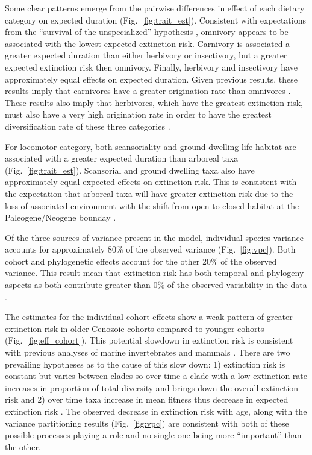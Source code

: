 \documentclass[12pt]{article}
\begin{document}
Some clear patterns emerge from the pairwise differences in effect of each dietary category on expected duration (Fig.~\ref{fig:trait_est}). Consistent with expectations from the ``survival of the unspecialized'' hypothesis \cite{Liow2004a,Simpson1944}, omnivory appears to be associated with the lowest expected extinction risk. Carnivory is associated a greater expected duration than either herbivory or insectivory, but a greater expected extinction risk then omnivory. Finally, herbivory and insectivory have approximately equal effects on expected duration. Given previous results, these results imply that carnivores have a greater origination rate than omnivores \cite{Price2012}. These results also imply that herbivores, which have the greatest extinction risk, must also have a very high origination rate in order to have the greatest diversification rate of these three categories \cite{Price2012}. 

For locomotor category, both scansoriality and ground dwelling life habitat are associated with a greater expected duration than arboreal taxa (Fig.~\ref{fig:trait_est}). Scansorial and ground dwelling taxa also have approximately equal expected effects on extinction risk.  This is consistent with the expectation that arboreal taxa will have greater extinction risk due to the loss of associated environment with the shift from open to closed habitat at the Paleogene/Neogene bounday \cite{Blois2009}.

Of the three sources of variance present in the model, individual species variance accounts for approximately 80\% of the observed variance (Fig.~\ref{fig:vpc}). Both cohort and phylogenetic effects account for the other 20\% of the observed variance. This result mean that extinction risk has both temporal and phylogeny aspects as both contribute greater than 0\% of the observed variability in the data \cite{Housworth2004}.

The estimates for the individual cohort effects show a weak pattern of greater extinction risk in older Cenozoic cohorts compared to younger cohorts (Fig.~\ref{fig:eff_cohort}). This potential slowdown in extinction risk is consistent with previous analyses of marine invertebrates \cite{Raup1982a,Foote2003} and mammals \cite{Alroy2010c,Alroy2000g}. There are two prevailing hypotheses as to the cause of this slow down: 1) extinction risk is constant but varies between clades so over time a clade with a low extinction rate increases in proportion of total diversity and brings down the overall extinction risk and 2) over time taxa increase in mean fitness thus decrease in expected extinction risk \cite{Raup1982a}. The observed decrease in extinction risk with age, along with the variance partitioning results (Fig.~\ref{fig:vpc}) are consistent with both of these possible processes playing a role and no single one being more ``important'' than the other.
\end{document}
